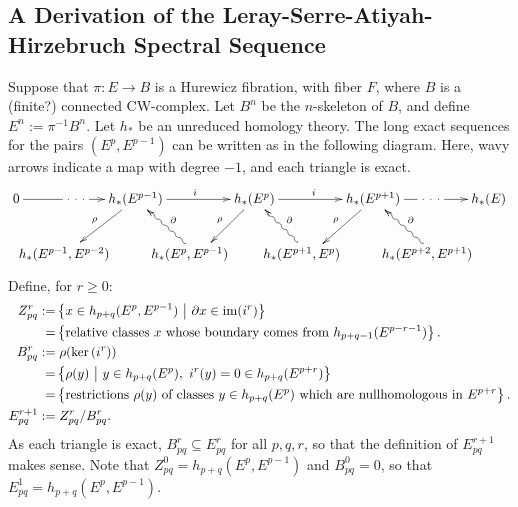 \documentclass[11pt]{article}
\newcommand{\myheading}[1]
{{\noindent\Large #1}

}
\newcommand{\shrt}[1]{\makebox[0cm]{\ensuremath{#1}}}
\renewcommand{\myheading}[1]{\subsection{#1}}
\begin{document}
\myheading{A Derivation of the Leray-Serre-Atiyah-Hirzebruch Spectral Sequence}
Suppose that $\pi:E\to B$ is a Hurewicz fibration, with fiber $F$, where $B$ is a (finite?) connected CW-complex. Let $B^n$ be the $n$-skeleton of $B$, and define $E^n:=\pi^{-1}B^n$. Let $h_*$ be an unreduced homology theory. The long exact sequences for the pairs $(E^p,E^{p-1})$ can be written as in the following diagram. Here, wavy arrows indicate a map with degree $-1$, and each triangle is exact.
\[\xymatrix@C=.5cm{
0\ar[rr]|{\ \cdot\ \cdot\ \cdot\ }&&h_*(E^{p-1})\ar[rr]^i\ar[ld]_\rho&&h_*(E^{p})\ar[rr]^i \ar[ld]_\rho&&h_*(E^{p+1})\ar[ld]_\rho
\ar[rr]|{\ \cdot\ \cdot\ \cdot\ }&&h_*(E)\\
&\ \ \ \ \shrt{h_*(E^{p-1},E^{p-2})}\phantom{\binom{5}{3}}&&
\shrt{h_*(E^{p},E^{p-1})}\phantom{\binom{5}{3}}\ar@{~>}[lu]_\partial&&
\shrt{h_*(E^{p+1},E^{p})}\phantom{\binom{5}{3}}\ar@{~>}[lu]_\partial&&
\shrt{h_*(E^{p+2},E^{p+1})}\phantom{\binom{5}{3}}\ar@{~>}[lu]_\partial
}\]
Define, for $r\geq0$:
\begin{alignat*}{2}
Z_{pq}^r:=&\left\{x\in h_{p+q}(E^p,E^{p-1})\ \middle|\ \partial x\in\im(i^{r})\right\}\\
=&\left\{\text{relative classes $x$ whose boundary comes from $h_{p+q-1}(E^{p-r-1})$}\right\}.\\
B_{pq}^r:=&\left.\rho(\ker(i^r))\right.\\
=&\left\{\rho(y)\ \middle|\ y\in h_{p+q}(E^p),\ i^r(y)=0\in h_{p+q}(E^{p+r})\right\}\\
=&\left\{\text{restrictions $\rho(y)$ of classes $y\in h_{p+q}(E^p)$ which are nullhomologous in $E^{p+r}$}\right\}.\\
E_{pq}^{r+1}:=&\left.Z_{pq}^r/B_{pq}^r.\right.%
\end{alignat*}
As each triangle is exact, $B_{pq}^r\subseteq E_{pq}^r$ for all $p,q,r$, so that the definition of $E_{pq}^{r+1}$ makes sense.
Note that $Z_{pq}^0=h_{p+q}(E^p,E^{p-1})$ and $B_{pq}^0=0$, so that $E_{pq}^1=h_{p+q}(E^p,E^{p-1})$.
\end{document}
